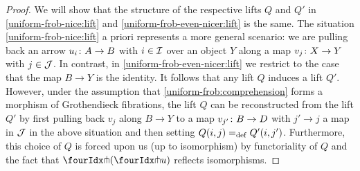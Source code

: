 \documentclass[reqno,10pt,a4paper,oneside,draft]{amsart}
\begin{document}
\begin{proof}
We will show that the structure of the respective lifts $Q$ and $Q'$ in \eqref{uniform-frob-nice:lift} and \eqref{uniform-frob-even-nicer:lift} is the same.
The situation \eqref{uniform-frob-nice:lift} a priori represents a more general scenario: we are pulling back an arrow $u_i \co A \to B$ with $i \in \cal{I}$ over an object $Y$ along a map $v_j \co X \to Y$ with $j \in \cal{J}$.
In contrast, in \eqref{uniform-frob-even-nicer:lift} we restrict to the case that the map $B \to Y$ is the identity.
It follows that any lift $Q$ induces a lift $Q'$.
However, under the assumption that \eqref{uniform-frob:comprehension} forms a morphism of Grothendieck fibrations, the lift $Q$ can be reconstructed from the lift $Q'$ by first pulling back $v_j$ along $B \to Y$ to a map $v_{j'} \co B \to D$ with $j' \to j$ a map in $\cal{J}$ in the above situation and then setting $Q(i, j) \defeq Q'(i, j')$.
Furthermore, this choice of $Q$ is forced upon us (up to isomorphism) by functoriality of $Q$ and the fact that $\liftl{(\liftr{u})}$ reflects isomorphisms.
\end{proof}
\end{document}
